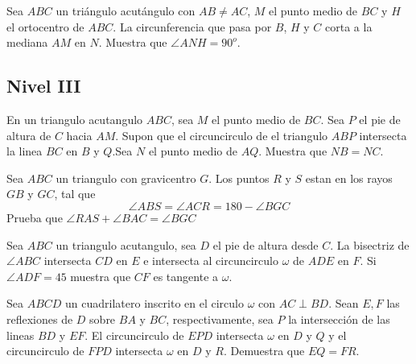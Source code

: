 \documentclass[11pt]{scrartcl}
\newcommand{\gad}{\textcolor{yellow}{$\bigstar$}}
\newcommand{\thmdifficulty}{0}
\newcommand{\problemdiff}[1]{\renewcommand{\thmdifficulty}{#1}}
\begin{document}
\problemdiff{3.5}
\begin{problem}%
     Sea $ABC$ un triángulo acutángulo con $AB \neq AC$, $M$ el punto medio de $BC$ y $H$ el
ortocentro de $ABC$. La circunferencia que pasa por $B$, $H$ y $C$ corta a la mediana $AM$ en
$N$. Muestra que $\angle ANH = 90^o$.
\end{problem}

\subsection{Nivel III}
\problemdiff{4}
\begin{problem}%
    En un triangulo acutangulo $ABC$, sea $M$ el punto medio de $BC$. Sea $P$ el pie de altura de $C$ hacia $AM$. Supon que el circuncirculo de el triangulo $ABP$ intersecta la linea $BC$ en $B$ y $Q$.Sea $N$ el punto medio de $AQ$. Muestra que $NB=NC$.
\end{problem}



\problemdiff{5}
\begin{problem}[\gad]%
    Sea $ABC$ un triangulo con gravicentro $G$. Los puntos $R$ y $S$ estan en los rayos $GB$ y $GC$, tal que 
    $$\angle ABS=\angle ACR=180-\angle BGC$$
    Prueba que $\angle RAS+\angle BAC=\angle BGC$
\end{problem}

\problemdiff{5}
\begin{problem} %
    Sea $ABC$ un triangulo acutangulo, sea $D$ el pie de altura desde $C$. La bisectriz de $\angle ABC$ intersecta $CD$ en $E$ e intersecta al circuncirculo $\omega$ de $ADE$ en $F$. Si $\angle ADF=45$ muestra que $CF$ es tangente a $\omega$.
\end{problem}


\problemdiff{6}
\begin{problem} [USAJMO 2018/3]
  Sea $ABCD$ un cuadrilatero inscrito en el circulo $\omega$ con $AC \perp BD$. Sean $E,F$ las reflexiones de $D$ sobre $BA$ y $BC$, respectivamente, sea $P$ la intersecci\'on de las lineas $BD$ y $EF$. El circuncirculo de $EPD$ intersecta $\omega$ en $D$ y $Q$ y el circuncirculo de $FPD$ intersecta $\omega$ en $D$ y $R$. Demuestra que $EQ=FR$.
\end{problem}
\end{document}
